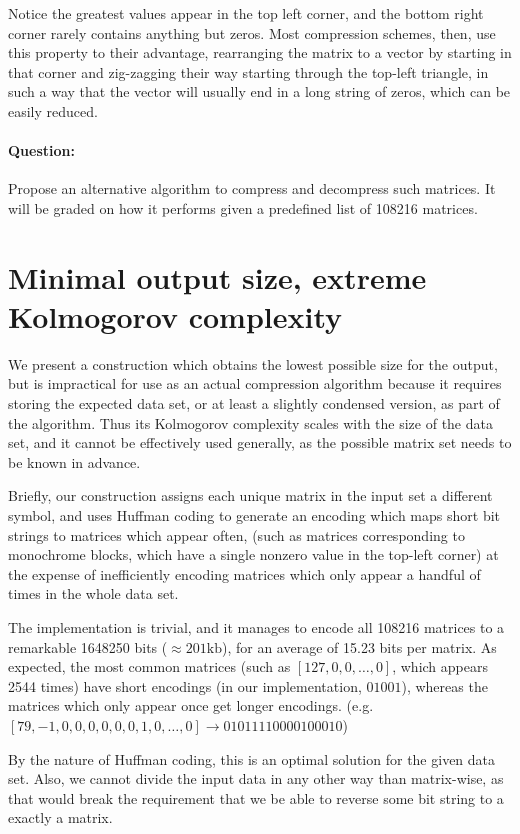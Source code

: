 \documentclass[11pt]{llncs}
\begin{document}
Notice the greatest values appear in the top left corner, and the bottom right corner rarely contains anything but zeros. Most compression schemes, then, use this property to their advantage, rearranging the matrix to a vector by starting in that corner and zig-zagging their way starting through the top-left triangle, in such a way that the vector will usually end in a long string of zeros, which can be easily reduced.

\paragraph{\textbf{Question:}} Propose an alternative algorithm to compress and decompress such matrices. It will be graded on how it performs given a predefined list of 108216 matrices.

\section{Minimal output size, extreme Kolmogorov complexity}

We present a construction which obtains the lowest possible size for the output, but is impractical for use as an actual compression algorithm because it requires storing the expected data set, or at least a slightly condensed version, as part of the algorithm. Thus its Kolmogorov complexity scales with the size of the data set, and it cannot be effectively used generally, as the possible matrix set needs to be known in advance.

Briefly, our construction assigns each unique matrix in the input set a different symbol, and uses Huffman coding to generate an encoding which maps short bit strings to matrices which appear often, (such as matrices corresponding to monochrome blocks, which have a single nonzero value in the top-left corner) at the expense of inefficiently encoding matrices which only appear a handful of times in the whole data set.

The implementation is trivial, and it manages to encode all 108216 matrices to a remarkable 1648250 bits ($\approx 201\text{kb}$), for an average of 15.23 bits per matrix. As expected, the most common matrices (such as $[127, 0, 0, \dots, 0]$, which appears 2544 times) have short encodings (in our implementation, $01001$), whereas the matrices which only appear once get longer encodings. (e.g. $[79, -1, 0, 0, 0, 0, 0, 0, 1, 0, \dots, 0] \rightarrow 01011110000100010$) 

By the nature of Huffman coding, this is an optimal solution for the given data set. Also, we cannot divide the input data in any other way than matrix-wise, as that would break the requirement that we be able to reverse some bit string to a exactly a matrix.
\end{document}
